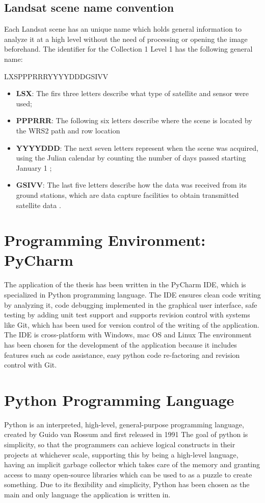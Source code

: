 \documentclass[12pt, a4paper]{report}
\begin{document}
	\subsection{Landsat scene name convention}
	Each Landsat scene has an unique name which holds general information to analyze it at a high level without the need of processing or opening the image beforehand. The identifier for the Collection 1 Level 1 has the following general name:
	\begin{center}
		LXSPPPRRRYYYYDDDGSIVV \cite{landsat_scene_name}
	\end{center}
	\begin{itemize}
		\item \textbf{LSX}: The firs three letters describe what type of satellite and sensor were used;
		\item \textbf{PPPRRR}: The following six letters describe where the scene is located by the WRS2 path and row location
		\item \textbf{YYYYDDD}: The next seven letters represent when the scene was acquired, using the Julian calendar by counting the number of days passed starting January 1 \cite{landsat_scene_name};
		\item \textbf{GSIVV}: The last five letters describe how the data was received from its ground stations, which are data capture facilities to obtain transmitted satellite data \cite{landsat_scene_name}.
	\end{itemize}
	
	\section{Programming Environment: PyCharm} 
	The application of the thesis has been written in the PyCharm IDE, which is specialized in Python programming language. The IDE ensures clean code writing by analyzing it, code debugging implemented in the graphical user interface, safe testing by adding unit test support and supports revision control with systems like Git, which has been used for version control of the writing of the application. The IDE is cross-platform with Windows, mac OS and Linux \cite{pycharm}
	The environment has been chosen for the development of the application because it includes features such as code assistance, easy python code re-factoring and revision control with Git.
	
	\section{Python Programming Language}
	Python is an interpreted, high-level, general-purpose programming language, created by Guido van Rossum and first released in 1991 \cite{python} The goal of python is simplicity, so that the programmers can achieve logical constructs in their projects at whichever scale, supporting this by being a high-level language, having an implicit garbage collector which takes care of the memory and granting access to many open-source libraries which can be used to as a puzzle to create something.
	Due to its flexibility and simplicity, Python has been chosen as the main and only language the application is written in. 
	
\end{document}
